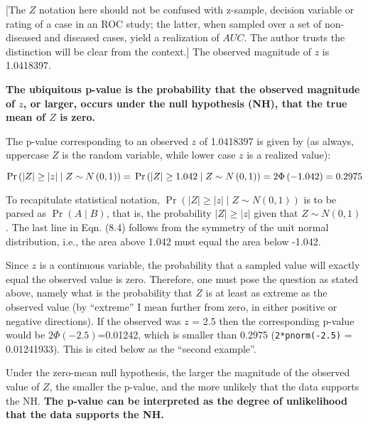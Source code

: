 \documentclass[
]{book}
\begin{document}
{[}The \(Z\) notation here should not be confused with z-sample, decision variable or rating of a case in an ROC study; the latter, when sampled over a set of non-diseased and diseased cases, yield a realization of \(AUC\). The author trusts the distinction will be clear from the context.{]} The observed magnitude of \(z\) is 1.0418397.

\textbf{The ubiquitous p-value is the probability that the observed magnitude of \(z\), or larger, occurs under the null hypothesis (NH), that the true mean of \(Z\) is zero.}

The p-value corresponding to an observed \(z\) of 1.0418397 is given by (as always, uppercase \(Z\) is the random variable, while lower case \(z\) is a realized value):

\begin{equation*} 
\Pr\left ( \lvert Z \rvert \geq \lvert z \rvert \mid Z\sim N\left ( 0,1 \right )\right )=\\
\Pr\left ( \lvert Z \rvert \geq 1.042 \mid Z\sim N\left ( 0,1 \right )\right )=\\
2\Phi\left ( -1.042 \right )=0.2975
\end{equation*}

To recapitulate statistical notation, \(\Pr\left ( \lvert Z \rvert \geq \lvert z \rvert \mid Z\sim N\left ( 0,1 \right )\right )\) is to be parsed as \(\Pr\left ( A\mid B \right )\), that is, the probability \(\lvert Z \rvert \geq \lvert z \rvert\) given that \(Z\sim N\left ( 0,1 \right )\). The last line in Eqn. (8.4) follows from the symmetry of the unit normal distribution, i.e., the area above 1.042 must equal the area below -1.042.

Since \(z\) is a continuous variable, the probability that a sampled value will exactly equal the observed value is zero. Therefore, one must pose the question as stated above, namely what is the probability that \(Z\) is at least as extreme as the observed value (by ``extreme'' I mean further from zero, in either positive or negative directions). If the observed was \(z\) = 2.5 then the corresponding p-value would be \(2\Phi(-2.5)\)=0.01242, which is smaller than 0.2975 (\texttt{2*pnorm(-2.5)} = 0.01241933). This is cited below as the ``second example''.

Under the zero-mean null hypothesis, the larger the magnitude of the observed value of \(Z\), the smaller the p-value, and the more unlikely that the data supports the NH. \textbf{The p-value can be interpreted as the degree of unlikelihood that the data supports the NH.}
\end{document}

